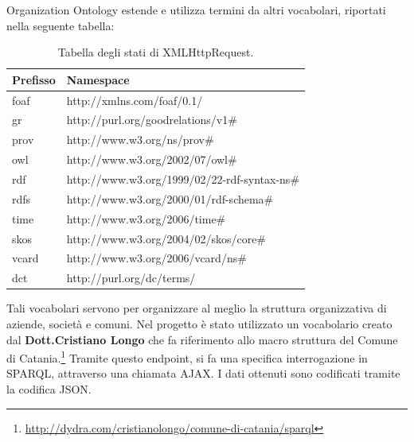 \documentclass[a4paper,11pt]{article}
\begin{document}
Organization Ontology estende e utilizza termini da altri vocabolari, riportati nella seguente tabella:
\begin{table}[!htb]
\begin{center}				
\begin{tabular}{|>{\small}l|>{\small}l|}
	\hline \textbf{Prefisso} & \textbf{Namespace}\\				
	\hline foaf & http://xmlns.com/foaf/0.1/\\
	\hline gr & http://purl.org/goodrelations/v1\#\\
	\hline prov & http://www.w3.org/ns/prov\#\\
	\hline owl & http://www.w3.org/2002/07/owl\#\\
	\hline rdf & http://www.w3.org/1999/02/22-rdf-syntax-ns\#\\
	\hline rdfs & http://www.w3.org/2000/01/rdf-schema\#\\			
	\hline time & http://www.w3.org/2006/time\#\\
	\hline skos & http://www.w3.org/2004/02/skos/core\#\\					
	\hline vcard & http://www.w3.org/2006/vcard/ns\#\\											\hline 	dct & http://purl.org/dc/terms/\\			
	\hline
\end{tabular}	
\caption{Tabella degli stati di XMLHttpRequest.}	
\end{center}	
\end{table}\newpage
Tali vocabolari servono per organizzare al meglio la struttura organizzativa di aziende, società e comuni.
Nel progetto è stato utilizzato un vocabolario creato dal \textbf{Dott.Cristiano Longo} che fa riferimento allo macro struttura del Comune di Catania.\footnote{\url{http://dydra.com/cristianolongo/comune-di-catania/sparql}}\newline
Tramite questo endpoint, si fa una specifica interrogazione in SPARQL, attraverso una chiamata AJAX. I dati ottenuti sono codificati tramite la codifica JSON.
\end{document}
